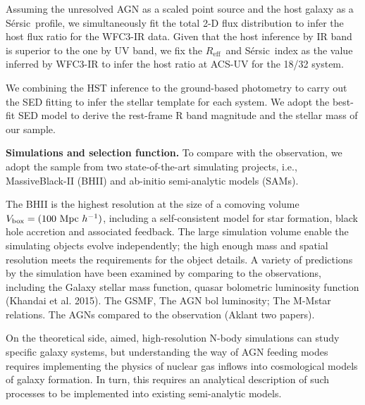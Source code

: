 \documentclass{natureprintstyle}
\newcommand{\mbh}{$\mathcal M_{\rm BH}$}
\newcommand{\sersic}{S\'ersic}
\newcommand{\reff}{{$R_{\mathrm{eff}}$}}
\begin{document}
Assuming the unresolved AGN as a scaled point source and the host galaxy as a \sersic\ profile, we simultaneously fit the total 2-D flux distribution to infer the host flux ratio for the WFC3-IR data. Given that the host inference by IR band is superior to the one by UV band, we fix the \reff\ and \sersic\ index as the value inferred by WFC3-IR to infer the host ratio at ACS-UV for the 18/32 system.

We combining the HST inference to the ground-based photometry to carry out the SED fitting to infer the stellar template for each system. We adopt the best-fit SED model to derive the rest-frame R band magnitude and the stellar mass of our sample.

\textbf{Simulations and selection function.} To compare with the observation, we adopt the sample from two state-of-the-art simulating projects, i.e., MassiveBlack-II (BHII) and ab-initio semi-analytic models (SAMs).

The BHII is the highest resolution at the size of a comoving volume $V_{\rm box} = (100~{\rm Mpc}~h^{-1})$, including a self-consistent model for star formation, black hole accretion and associated feedback. The large simulation volume enable the simulating objects evolve independently; the high enough mass and spatial resolution meets the requirements for the object details. A variety of predictions by the simulation have been examined by comparing to the observations, including 
the Galaxy stellar mass function, quasar bolometric luminosity function (Khandai et al. 2015). %
The GSMF, The AGN bol luminosity; The M-Mstar relations. The AGNs compared to the observation (Aklant two papers).

On the theoretical side, aimed, high-resolution N-body simulations can study specific galaxy systems, but understanding the way of AGN feeding modes requires implementing the physics of nuclear gas inflows into cosmological models of galaxy formation. In turn, this requires an analytical description of such processes to be implemented into existing semi-analytic models.
\end{document}

